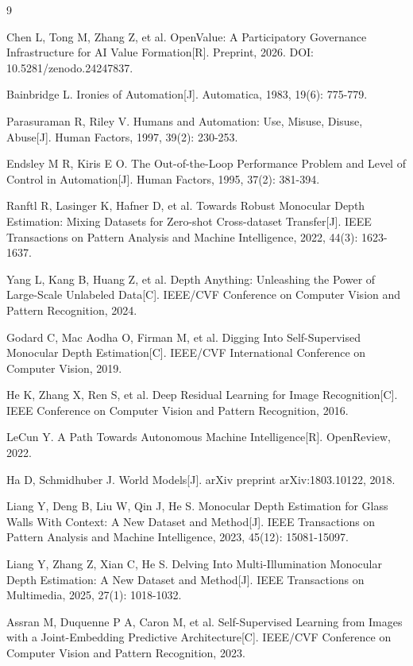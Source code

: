 \documentclass[12pt,a4paper]{ctexart}
\begin{document}
\begin{thebibliography}{9}

 Chen L, Tong M, Zhang Z, et al. OpenValue: A Participatory Governance Infrastructure for AI Value Formation[R]. Preprint, 2026. DOI: 10.5281/zenodo.24247837.

 Bainbridge L. Ironies of Automation[J]. Automatica, 1983, 19(6): 775-779.

 Parasuraman R, Riley V. Humans and Automation: Use, Misuse, Disuse, Abuse[J]. Human Factors, 1997, 39(2): 230-253.

 Endsley M R, Kiris E O. The Out-of-the-Loop Performance Problem and Level of Control in Automation[J]. Human Factors, 1995, 37(2): 381-394.

 Ranftl R, Lasinger K, Hafner D, et al. Towards Robust Monocular Depth Estimation: Mixing Datasets for Zero-shot Cross-dataset Transfer[J]. IEEE Transactions on Pattern Analysis and Machine Intelligence, 2022, 44(3): 1623-1637.

 Yang L, Kang B, Huang Z, et al. Depth Anything: Unleashing the Power of Large-Scale Unlabeled Data[C]. IEEE/CVF Conference on Computer Vision and Pattern Recognition, 2024.

 Godard C, Mac Aodha O, Firman M, et al. Digging Into Self-Supervised Monocular Depth Estimation[C]. IEEE/CVF International Conference on Computer Vision, 2019.

 He K, Zhang X, Ren S, et al. Deep Residual Learning for Image Recognition[C]. IEEE Conference on Computer Vision and Pattern Recognition, 2016.

 LeCun Y. A Path Towards Autonomous Machine Intelligence[R]. OpenReview, 2022.

 Ha D, Schmidhuber J. World Models[J]. arXiv preprint arXiv:1803.10122, 2018.

 Liang Y, Deng B, Liu W, Qin J, He S. Monocular Depth Estimation for Glass Walls With Context: A New Dataset and Method[J]. IEEE Transactions on Pattern Analysis and Machine Intelligence, 2023, 45(12): 15081-15097.

 Liang Y, Zhang Z, Xian C, He S. Delving Into Multi-Illumination Monocular Depth Estimation: A New Dataset and Method[J]. IEEE Transactions on Multimedia, 2025, 27(1): 1018-1032.

 Assran M, Duquenne P A, Caron M, et al. Self-Supervised Learning from Images with a Joint-Embedding Predictive Architecture[C]. IEEE/CVF Conference on Computer Vision and Pattern Recognition, 2023.


\end{thebibliography}
\end{document}
